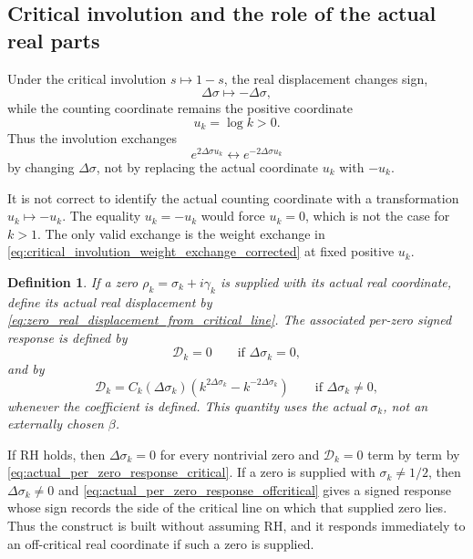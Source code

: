 \documentclass[12pt]{article}
\numberwithin{equation}{section}
\newtheorem{definition}[theorem]{Definition}
\begin{document}
\subsection{Critical involution and the role of the actual real parts}
\label{subsec:critical_involution_actual_real_parts}


\noindent Under the critical involution \(s\mapsto1-s\), the real displacement changes sign,
\begin{equation}
\Delta\sigma
\longmapsto
-\Delta\sigma,
\end{equation}
while the counting coordinate remains the positive coordinate
\begin{equation}
u_k=\log k>0.
\end{equation}
Thus the involution exchanges
\begin{equation}
e^{2\Delta\sigma u_k}
\longleftrightarrow
 e^{-2\Delta\sigma u_k}
\label{eq:critical_involution_weight_exchange_corrected}
\end{equation}
by changing \(\Delta\sigma\), not by replacing the actual coordinate \(u_k\) with \(-u_k\).


\noindent It is not correct to identify the actual counting coordinate with a transformation \(u_k\mapsto -u_k\).  The equality \(u_k=-u_k\) would force \(u_k=0\), which is not the case for \(k>1\).  The only valid exchange is the weight exchange in \eqref{eq:critical_involution_weight_exchange_corrected} at fixed positive \(u_k\).


\begin{definition}
\label{def:actual_real_coordinate_response}
If a zero \(\rho_k=\sigma_k+i\gamma_k\) is supplied with its actual real coordinate, define its actual real displacement by \eqref{eq:zero_real_displacement_from_critical_line}.  The associated per-zero signed response is defined by
\begin{equation}
\mathcal{D}_k
=
0
\qquad
\text{if }\Delta\sigma_k=0,
\label{eq:actual_per_zero_response_critical}
\end{equation}
and by
\begin{equation}
\mathcal{D}_k
=
C_k(\Delta\sigma_k)
\left(k^{2\Delta\sigma_k}-k^{-2\Delta\sigma_k}\right)
\qquad
\text{if }\Delta\sigma_k\neq0,
\label{eq:actual_per_zero_response_offcritical}
\end{equation}
whenever the coefficient is defined.  This quantity uses the actual \(\sigma_k\), not an externally chosen \(\beta\).
\end{definition}


\noindent If RH holds, then \(\Delta\sigma_k=0\) for every nontrivial zero and \(\mathcal{D}_k=0\) term by term by \eqref{eq:actual_per_zero_response_critical}.  If a zero is supplied with \(\sigma_k\neq1/2\), then \(\Delta\sigma_k\neq0\) and \eqref{eq:actual_per_zero_response_offcritical} gives a signed response whose sign records the side of the critical line on which that supplied zero lies.  Thus the construct is built without assuming RH, and it responds immediately to an off-critical real coordinate if such a zero is supplied.
\end{document}
